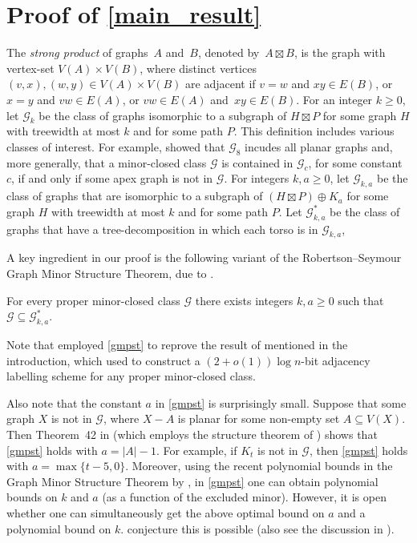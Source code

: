 \documentclass{patmorin}
\renewcommand{\geq}{\geqslant}
\newcommand{\defin}[1]{\emph{\textcolor{brightmaroon}{#1}}}
\begin{document}
  \section{Proof of \cref{main_result}}
  \label{gpmst_section}

The \defin{strong product} of graphs~$A$ and~$B$, denoted by~${A \boxtimes B}$, is the graph with vertex-set ${V(A) \times V(B)}$, where distinct vertices ${(v,x),(w,y) \in V(A) \times V(B)}$ are adjacent if
	${v=w}$ and ${xy \in E(B)}$, or
	${x=y}$ and ${vw \in E(A)}$, or
	${vw \in E(A)}$ and~${xy \in E(B)}$.
For an integer $k\geq 0$, let \defin{$\mathcal{G}_{k}$} be the class of graphs isomorphic to a subgraph of $H\boxtimes P$ for some graph $H$ with treewidth at most $k$ and for some path $P$. This definition includes various classes of interest. For example, \citet{dujmovic.joret.ea:planar} showed that
$\mathcal{G}_{8}$ incudes all planar graphs and, more generally, that a minor-closed class $\mathcal{G}$ is contained in $\mathcal{G}_c$, for some constant $c$, if and only if some apex graph is not in $\mathcal{G}$. For integers $k,a\geq 0$, let \defin{$\mathcal{G}_{k,a}$} be the class of graphs that are isomorphic to a subgraph of $(H\boxtimes P)\oplus K_a$ for some graph $H$ with treewidth at most $k$ and for some path $P$. Let \defin{$\mathcal{G}^*_{k,a}$} be the class of graphs that have a tree-decomposition in which each torso is in $\mathcal{G}_{k,a}$,

A key ingredient in our proof is the following variant of the Robertson--Seymour Graph Minor Structure Theorem, due to \citet{dujmovic.joret.ea:planar}.

  \begin{thm}
  \label{gmpst}
  For every proper minor-closed class $\mathcal{G}$ there exists integers $k,a\geq 0$ such that $\mathcal{G} \subseteq \mathcal{G}^*_{k,a}$.
  \end{thm}

Note that \citet{dujmovic.joret.ea:planar} employed \cref{gmpst} to reprove the result of \citet{devos2004} mentioned in the introduction, which \citet{gavoille.labourel:shorter} used to construct a ${(2+o(1))\log n}$-bit adjacency labelling scheme for any proper minor-closed class.

Also note that the constant $a$ in \cref{gmpst} is surprisingly small. Suppose that some graph $X$ is not in $\mathcal{G}$, where $X-A$ is planar for some non-empty set $A\subseteq V(X)$. Then Theorem~42 in \citep{dujmovic.joret.ea:planar} (which employs the structure theorem of \citet{DvoTho}) shows that \cref{gmpst} holds with $a=|A|-1$. For example, if $K_t$ is not in $\mathcal{G}$, then \cref{gmpst} holds with $a=\max\{t-5,0\}$. Moreover, using the recent polynomial bounds in the Graph Minor Structure Theorem by \citet{gorsky2025polynomial}, in \cref{gmpst} one can obtain polynomial bounds on $k$ and $a$ (as a function of the excluded minor). However, it is open whether one can simultaneously get the above optimal bound on $a$ and a polynomial bound on $k$. \citet[Conjecture~18.9]{gorsky2025polynomial} conjecture this is possible (also see the discussion in \citep{GSW26}).
\end{document}
